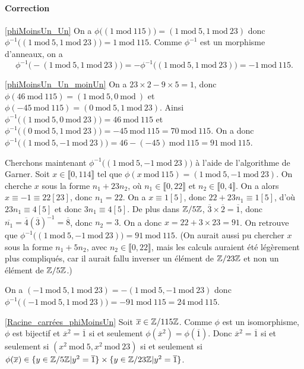 \documentclass[11pt,a4paper]{article}
\begin{document}
\paragraph{Correction}

\eqref{phiMoinsUn_Un} On a $\phi\big((1\mathrm{\ mod\ }115)\big)=(1\mathrm{\ mod\ }5,1\mathrm{\ mod\ }23)$ donc $\phi^{-1}\big((1\mathrm{\ mod\ }5,1\mathrm{\ mod\ }23)\big)=1\mathrm{\ mod\ }115$. Comme $\phi^{-1}$ est un morphisme d'anneaux, on a \[\phi^{-1}\big(-(1\mathrm{\ mod\ }5,1\mathrm{\ mod\ }23)\big)=-\phi^{-1}\big((1\mathrm{\ mod\ }5,1\mathrm{\ mod\ }23)\big)=-1\mathrm{\ mod\ }115.\]

\eqref{phiMoinsUn_Un_moinUn} On a $23\times 2-9\times 5=1$, donc $\phi(46\mathrm{\ mod\ }115)=(1\mathrm{\ mod\ } 5,0\mathrm{\ mod\ })$ et $\phi(-45\mathrm{\ mod\ }115)=(0\mathrm{\ mod\ }5,1\mathrm{\ mod\ }23)$. Ainsi $\phi^{-1}\big((1\mathrm{\ mod\ }5,0 \mathrm{\ mod \ }23)\big)=46\mathrm{\ mod\ }115$ et $\phi^{-1}\big((0\mathrm{\ mod\ }5,1 \mathrm{\ mod \ }23)\big)=-45\mathrm{\ mod\ }115=70\mathrm{\ mod\ }115$. On a donc $\phi^{-1}\big((1\mathrm{\ mod\ }5,-1\mathrm{\ mod\ }23)\big)=46-(-45)\mathrm{\ mod\ }115=91\mathrm{\ mod\ }115$.

Cherchons maintenant $\phi^{-1}\big((1\mathrm{\ mod\ }5,-1\mathrm{\ mod\ }23)\big)$ à l'aide de l'algorithme de Garner. Soit $x\in \llbracket 0,114\rrbracket$ tel que $\phi(x\mathrm{\ mod\ }115)=(1\mathrm{\ mod\ }5,-1\mathrm{\ mod\ }23)$. On cherche $x$ sous la forme $n_1+23 n_2$, où $n_1\in \llbracket 0,22\rrbracket$ et $n_2\in \llbracket 0,4\rrbracket$. On a alors $x\equiv -1\equiv 22[23]$, donc $n_1=22$. On a $x\equiv 1[5]$, donc $22+23n_1\equiv 1[5]$, d'où $23n_1\equiv 4[5]$ et donc $3 n_1\equiv 4[5]$. De plus dans $\mathbb{Z}/5\mathbb{Z}$, $\overline{3}\times \overline{2}=\overline{1}$, donc $\overline{n_1}=\overline{4}(\overline{3})^{-1}=\overline{8}$, donc $n_2=3$. On a donc $x=22+3\times 23=91$.  On retrouve que $\phi^{-1}\big((1\mathrm{\ mod\ }5,-1\mathrm{\ mod\ }23)\big)=91\mathrm{\ mod\ }115$. (On aurait aussi pu chercher $x$ sous la forme $n_1+5n_2$, avec $n_2\in  \llbracket 0,22\rrbracket$, mais les calculs auraient été légèrement plus compliqués, car il aurait fallu inverser un élément de $\mathbb{Z}/23\mathbb{Z}$ et non un élément de $\mathbb{Z}/5\mathbb{Z}$.) 

On a $(-1\mathrm{\ mod\ }5,1\mathrm{\ mod\ }23)=-(1\mathrm{\ mod\ }5,-1\mathrm{\ mod\ }23)$ donc $\phi^{-1}\big((-1\mathrm{\ mod\ }5,1\mathrm{\ mod\ }23)\big)=-91 \mathrm{\ mod\ }115=24\mathrm{\ mod\ }115$.

\eqref{Racine_carrées_phiMoinsUn}  Soit $\overline{x}\in \mathbb{Z}/115\mathbb{Z}$.  Comme $\phi$ est un isomorphisme, $\phi$ est bijectif et  $\overline{x}^2=\overline{1}$ si et seulement $\phi(\overline{x}^2)=\phi(\overline{1})$. Donc $\overline{x}^2=\overline{1}$ si et seulement si $(x^2\mathrm{\ mod\ }5,x^2\mathrm{\ mod\ }23)$ si et seulement si $\phi(\overline{x})\in \{y\in \mathbb{Z}/5\mathbb{Z}| y^2=\overline{1}\}\times  \{y\in \mathbb{Z}/23\mathbb{Z}|y^2=\overline{1}\}$.
\end{document}
